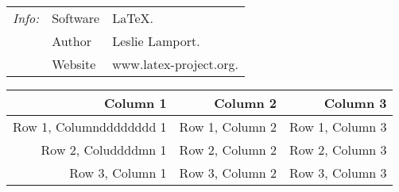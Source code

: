\documentclass{article}
\begin{document}
\begin{tabular}{@{}>{\itshape}l>{\centering\arraybackslash}l!{:}l<{.}@{}}
  \hline
  Info:     & Software & \LaTeX\\
            & Author   & Leslie Lamport\\[12pt]
            & Website  & www.latex-project.org\\
  \hline
\end{tabular}
\begin{tabular}{*{3}r}
        \hline
        \textbf{Column 1} & \textbf{Column 2} & \textbf{Column 3} \\
        \hline
        Row 1, Columndddddddd 1 & Row 1, Column 2 & Row 1, Column 3 \\
        Row 2, Coluddddmn 1 & Row 2, Column 2 & Row 2, Column 3 \\
        Row 3, Column 1 & Row 3, Column 2 & Row 3, Column 3 \\
        \hline
    \end{tabular}
\end{document}

